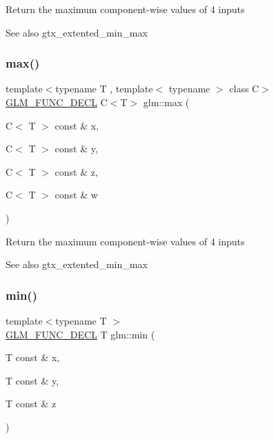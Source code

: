 Return the maximum component-\/wise values of 4 inputs \begin{DoxySeeAlso}{See also}
gtx\+\_\+extented\+\_\+min\+\_\+max 
\end{DoxySeeAlso}
\mbox{\label{group__gtx__extended__min__max_gaacffbc466c2d08c140b181e7fd8a4858}} 
\subsubsection{\texorpdfstring{max()}{max()}\hspace{0.1cm}{\footnotesize\ttfamily [6/6]}}
{\footnotesize\ttfamily template$<$typename T , template$<$ typename $>$ class C$>$ \\
\mbox{\hyperlink{setup_8hpp_ab2d052de21a70539923e9bcbf6e83a51}{G\+L\+M\+\_\+\+F\+U\+N\+C\+\_\+\+D\+E\+CL}} C$<$T$>$ glm\+::max (\begin{DoxyParamCaption}\item[{C$<$ T $>$ const \&}]{x,  }\item[{C$<$ T $>$ const \&}]{y,  }\item[{C$<$ T $>$ const \&}]{z,  }\item[{C$<$ T $>$ const \&}]{w }\end{DoxyParamCaption})}

Return the maximum component-\/wise values of 4 inputs \begin{DoxySeeAlso}{See also}
gtx\+\_\+extented\+\_\+min\+\_\+max 
\end{DoxySeeAlso}
\mbox{\label{group__gtx__extended__min__max_ga713d3f9b3e76312c0d314e0c8611a6a6}} 
\subsubsection{\texorpdfstring{min()}{min()}\hspace{0.1cm}{\footnotesize\ttfamily [1/6]}}
{\footnotesize\ttfamily template$<$typename T $>$ \\
\mbox{\hyperlink{setup_8hpp_ab2d052de21a70539923e9bcbf6e83a51}{G\+L\+M\+\_\+\+F\+U\+N\+C\+\_\+\+D\+E\+CL}} T glm\+::min (\begin{DoxyParamCaption}\item[{T const \&}]{x,  }\item[{T const \&}]{y,  }\item[{T const \&}]{z }\end{DoxyParamCaption})}

